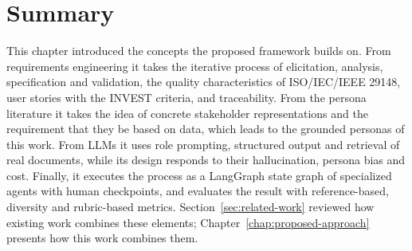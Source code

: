 \section{Summary}
\label{sec:bg-summary}

This chapter introduced the concepts the proposed framework builds on. From requirements engineering it takes the iterative process of elicitation, analysis, specification and validation, the quality characteristics of ISO/IEC/IEEE 29148, user stories with the INVEST criteria, and traceability. From the persona literature it takes the idea of concrete stakeholder representations and the requirement that they be based on data, which leads to the grounded personas of this work. From LLMs it uses role prompting, structured output and retrieval of real documents, while its design responds to their hallucination, persona bias and cost. Finally, it executes the process as a LangGraph state graph of specialized agents with human checkpoints, and evaluates the result with reference-based, diversity and rubric-based metrics. Section~\ref{sec:related-work} reviewed how existing work combines these elements; Chapter~\ref{chap:proposed-approach} presents how this work combines them.
